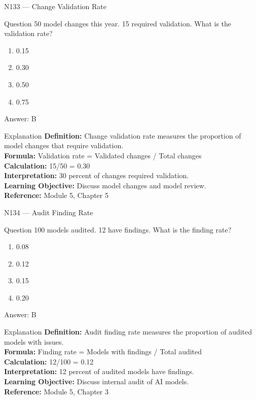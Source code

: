 \documentclass[aspectratio=169,8pt]{beamer}
\begin{document}
	\begin{frame}{N133 --- Change Validation Rate}
		\begin{block}{Question}
			50 model changes this year. 15 required validation. What is the validation rate?
			\begin{enumerate}
				\item 0.15
				\item 0.30
				\item 0.50
				\item 0.75
			\end{enumerate}
		\end{block}
		\begin{exampleblock}{Answer: B}\end{exampleblock}
		\begin{block}{Explanation}
			\textbf{Definition:} Change validation rate measures the proportion of model changes that require validation.\\
			\textbf{Formula:} Validation rate = Validated changes / Total changes\\
			\textbf{Calculation:} 15/50 = 0.30\\
			\textbf{Interpretation:} 30 percent of changes required validation.\\
			\textbf{Learning Objective:} Discuss model changes and model review.\\
			\textbf{Reference:} Module 5, Chapter 5
		\end{block}
	\end{frame}
	
	\begin{frame}{N134 --- Audit Finding Rate}
		\begin{block}{Question}
			100 models audited. 12 have findings. What is the finding rate?
			\begin{enumerate}
				\item 0.08
				\item 0.12
				\item 0.15
				\item 0.20
			\end{enumerate}
		\end{block}
		\begin{exampleblock}{Answer: B}\end{exampleblock}
		\begin{block}{Explanation}
			\textbf{Definition:} Audit finding rate measures the proportion of audited models with issues.\\
			\textbf{Formula:} Finding rate = Models with findings / Total audited\\
			\textbf{Calculation:} 12/100 = 0.12\\
			\textbf{Interpretation:} 12 percent of audited models have findings.\\
			\textbf{Learning Objective:} Discuss internal audit of AI models.\\
			\textbf{Reference:} Module 5, Chapter 3
		\end{block}
	\end{frame}
	
\end{document}
